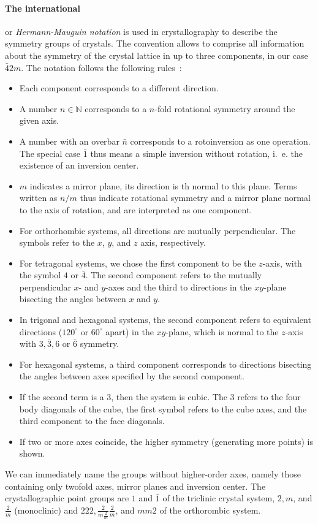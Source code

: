 \paragraph{The international} or \emph{Hermann-Mauguin notation} 
is used in crystallography to describe the symmetry groups of crystals. 
The convention allows to comprise all information about the symmetry 
of the crystal lattice in up to three components, in our case $\bar{4}2m$. 
The notation follows the following rules~\cite{sands1993introduction}:
\begin{itemize}
    \item
    Each component corresponds to a different direction. 
    \item
    A number $n \in \mathbb{N}$ corresponds to a $n$-fold rotational symmetry 
    around the given axis. 
    \item
    A number with an overbar $\bar{n}$ corresponds 
    to a rotoinversion as one operation. The special case $\bar{1}$ thus 
    means a simple inversion without rotation, i.~e. the existence of 
    an inversion center. 
    \item
    $m$ indicates a mirror plane, its direction is th normal to this plane.
    Terms written as $n/m$ thus indicate rotational symmetry and a mirror plane 
    normal to the axis of rotation, and are interpreted as one component. 
    \item
    For orthorhombic systems, all directions are mutually perpendicular. 
    The symbols refer to the $x$, $y$, and $z$ axis, respectively.
    \item
    For tetragonal systems, we chose the first component to be the $z$-axis, 
    with the symbol $4$ or $\bar{4}$. The second component refers to the 
    mutually perpendicular $x$- and $y$-axes and the third to directions in the 
    $xy$-plane bisecting the angles between $x$ and $y$. 
    \item
    In trigonal and hexagonal systems, the second component refers to 
    equivalent directions ($120^\circ$ or $60^\circ$ apart) in the $xy$-plane, 
    which is normal to the $z$-axis with $3, \bar{3}, 6$ or $\bar{6}$ symmetry. 
    \item
    For hexagonal systems, a third component corresponds to directions bisecting 
    the angles between axes specified by the second component. 
    \item
    If the second term is a $3$, then the system is cubic. The $3$ refers to the 
    four body diagonals of the cube, the first symbol refers to the cube axes, and the 
    third component to the face diagonals.
    \item
    If two or more axes coincide, the higher symmetry (generating more points) is 
    shown. 
\end{itemize}
We can immediately name the groups without higher-order axes, namely those 
containing only twofold axes, mirror planes and inversion center. The 
crystallographic point groups are $1$ and $\bar{1}$ of the 
triclinic crystal system, $2, m$, and $\frac{2}{m}$ (monoclinic) and 
$222, \frac{2}{m\frac{2}{m}}\frac{2}{m}$, and $mm2$ of the orthorombic system. 

